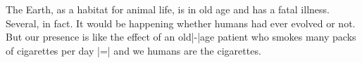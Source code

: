 The Earth, as a habitat for animal life, is in old age and
has a fatal illness. Several, in fact. It would be happening
whether humans had ever evolved or not. But our presence is
like the effect of an old|-|age patient who smokes many packs
of cigarettes per day |=| and we humans are the cigarettes.

